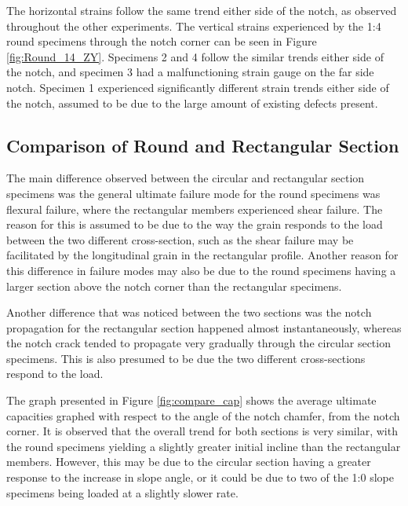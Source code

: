 \documentclass[11pt,a4paper]{article}
\numberwithin{equation}{subsection}
\begin{document}
\noindent
The horizontal strains follow the same trend either side of the notch, as observed throughout the other experiments. The vertical strains experienced by the 1:4 round specimens through the notch corner can be seen in Figure \ref{fig:Round_14_ZY}. Specimens 2 and 4 follow the similar trends either side of the notch, and specimen 3 had a malfunctioning strain gauge on the far side notch. Specimen 1 experienced significantly different strain trends either side of the notch, assumed to be due to the large amount of existing defects present.    

\subsection{Comparison of Round and Rectangular Section}
The main difference observed between the circular and rectangular section specimens was the general ultimate failure mode for the round specimens was flexural failure, where the rectangular members experienced shear failure. The reason for this is assumed to be due to the way the grain responds to the load between the two different cross-section, such as the shear failure may be facilitated by the longitudinal grain in the rectangular profile. Another reason for this difference in failure modes may also be due to the round specimens having a larger section above the notch corner than the rectangular specimens. 
\vspace*{\baselineskip}

\noindent
Another difference that was noticed between the two sections was the notch propagation for the rectangular section happened almost instantaneously, whereas the notch crack tended to propagate very gradually through the circular section specimens. This is also presumed to be due the two different cross-sections respond to the load. 

\vspace*{\baselineskip}

\noindent
The graph presented in Figure \ref{fig:compare_cap} shows the average ultimate capacities graphed with respect to the angle of the notch chamfer, from the notch corner. It is observed that the overall trend for both sections is very similar, with the round specimens yielding a slightly greater initial incline than the rectangular members. However, this may be due to the circular section having a greater response to the increase in slope angle, or it could be  due to two of the 1:0 slope specimens being loaded at a slightly slower rate.
\end{document}
